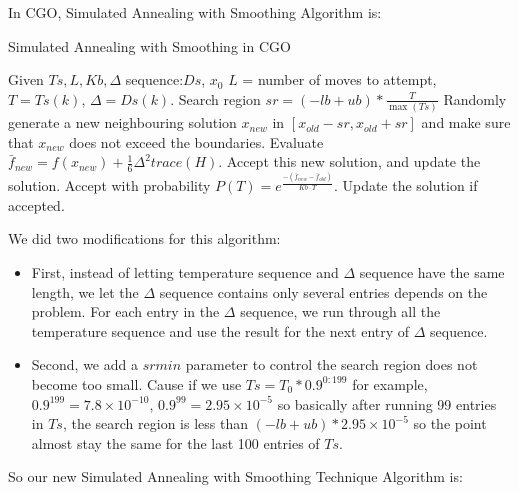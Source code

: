 \documentclass[letterpaper,12pt,titlepage,oneside,final]{book}
\begin{document}
In CGO, Simulated Annealing with Smoothing Algorithm is:

\begin{algorithm} [H]
\caption{Simulated Annealing with Smoothing in CGO}
\begin{algorithmic} 
\STATE Given $Ts, L, Kb, \Delta$ sequence:$Ds$, $x_0$
\STATE $L$ = number of moves to attempt, $T= Ts(k)$, $\Delta=Ds(k)$.
\STATE Search region $sr=(-lb+ub)*\frac{T}{\max(Ts)}$
\STATE Randomly generate a new neighbouring solution $x_{new}$ in $[x_{old}-sr,x_{old}+sr]$ and make sure that $x_{new}$ does not exceed the boundaries.
\STATE Evaluate $\bar{f}_{new}=f(x_{new})+\frac{1}{6}\Delta^2trace(H)$.
\STATE Accept this new solution, and update the solution. 
\ELSE 
\STATE Accept with probability $P(T) = e^{\frac{-(\bar{f}_{new}-\bar{f}_{old})}{Kb\cdot T} }$. 
\STATE  Update the solution if accepted.
\ENDIF
\ENDFOR
\ENDFOR
\end{algorithmic}
\end{algorithm}

We did two modifications for this algorithm:

\begin{itemize}

\item First, instead of letting temperature sequence and $\Delta$ sequence have the same length, we let the $\Delta$ sequence contains only several entries depends on the problem. For each entry in the $\Delta$ sequence, we run through all the temperature sequence and use the result for the next entry of $\Delta$ sequence.

\item Second, we add a $srmin$ parameter to control the search region does not become too small. Cause if we use $Ts=T_0*0.9^{0:199}$ for example, $0.9^{199}=7.8\times 10^{-10}$, $0.9^{99}=2.95\times 10^{-5}$ so basically after running 99 entries in $Ts$, the search region is less than $(-lb+ub)*2.95\times 10^{-5}$ so the point almost stay the same for the last 100 entries of $Ts$.

\end{itemize}

So our new Simulated Annealing with Smoothing Technique Algorithm is:
\end{document}
